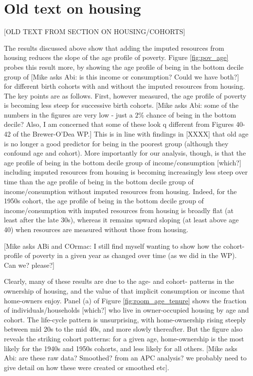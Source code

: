 \section{Old text on housing} \label{sec:annex_housing}

[OLD TEXT FROM SECTION ON HOUSING/COHORTS]

The results discussed above show that adding the imputed resources from housing reduces the slope of the age profile of poverty.  Figure \ref{fig:pov_age} probes this result more, by showing the age profile of being in the bottom decile group of [Mike asks Abi: is this income or consumption? Could we have both?] for different birth cohorts with and without the imputed resources from housing. The key points are as follows. First, however measured, the age profile of poverty is becoming less steep for successive birth cohorts. [Mike asks Abi: some of the numbers in the figures are very low - just a $2\%$ chance of being in the bottom decile? Also, I am concerned that some of these look q different from Figures 40-42 of the Brewer-O'Dea WP.] This is in line with findings in [XXXX] that old age is no longer a good predictor for being in the poorest group (although they confound age and cohort). More importantly for our analysis, though, is that the age profile of being in the bottom decile group of income/consumption [which?] including imputed resources from housing is becoming increasingly less steep over time than the age profile of being in the bottom decile group of income/consumption without imputed resources from housing. Indeed, for the 1950s cohort, the age profile  of being in the bottom decile group of income/consumption with imputed resources from housing is broadly flat (at least after the late 30s), whereas it remains upward sloping (at least above age 40) when resources are measured without those from housing.

[Mike asks ABi and COrmac: I still find myself wanting to show how the cohort-profile of poverty in a given year as changed over time (as we did in the WP). Can we? please?]

Clearly, many of these results are due to the age- and cohort- patterns in the ownership of housing, and the value of that implicit consumption or income that home-owners enjoy. Panel (a) of Figure \ref{fig:room_age_tenure} shows the fraction of individuals/households [which?] who live in owner-occupied housing by age and cohort. The life-cycle pattern is unsurprising, with home-ownership rising steeply between mid 20s to the mid 40s, and more slowly thereafter. But the figure also reveals the striking cohort patterns: for a given age, home-ownership is the most likely for the 1940s and 1950s cohorts, and less likely for all others.  [Mike asks Abi: are these raw data? Smoothed? from an APC analysis? we probably need to give detail on how these were created or smoothed etc].

